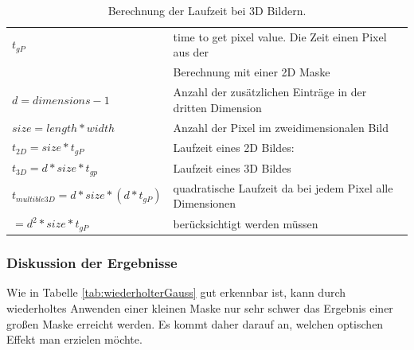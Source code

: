 \documentclass[12pt,german]{article}
\begin{document}
\begin{table}
\begin{tabular}{| l | l |}
	\hline
	$t_{gP}$ & time to get pixel value. Die Zeit einen Pixel aus der \\
	& Berechnung mit einer 2D Maske \\
	\hline	
	$d  = dimensions - 1$ & Anzahl der zusätzlichen Einträge in der dritten Dimension \\
	\hline	
	$size = length  * width $ & Anzahl der Pixel im zweidimensionalen Bild \\
	\hline	
	$t_{2D} = size * t_{gP} $ & Laufzeit eines 2D Bildes:\\
	\hline	
	$t_{3D} = d * size * t_{gp} $ & Laufzeit eines 3D Bildes \\
	\hline	
	$t_{multible3D} = d * size * ( d * t_{gP} ) $ & quadratische Laufzeit da bei jedem Pixel alle Dimensionen\\
	$               = d^2 *size * t_{gP}$       &  berücksichtigt werden müssen \\
	\hline
	
\end{tabular}

\caption{Berechnung der Laufzeit bei 3D Bildern.}
\label{calculation}
\end{table}


\subsubsection{Diskussion der Ergebnisse}
Wie in Tabelle \ref{tab:wiederholterGauss} gut erkennbar ist, kann durch wiederholtes Anwenden einer kleinen Maske nur sehr schwer das Ergebnis einer großen Maske erreicht werden. Es kommt daher darauf an, welchen optischen Effekt man erzielen möchte.
\end{document}
